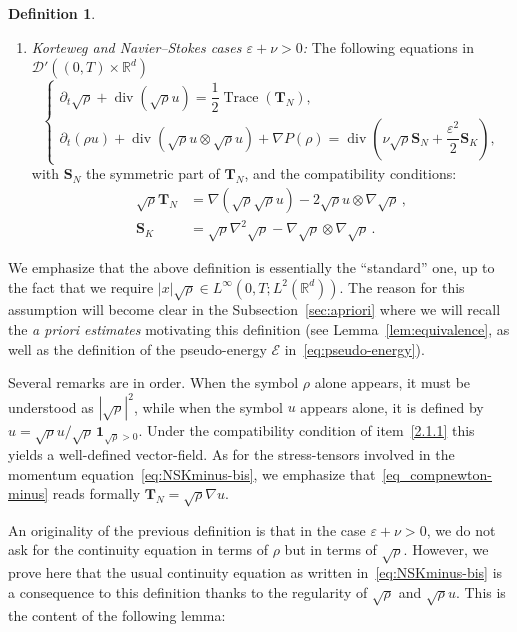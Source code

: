 \documentclass[10pt]{amsart}
\theoremstyle{definition}\newtheorem{defi}[theo]{Definition}\newtheorem{rema}[theo]{Remark}\newtheorem{exam}[theo]{Example}\newtheorem{exem}[theo]{Example}\newtheorem{nota}[theo]{Notation}
\DeclareMathOperator{\DIV}{div}
\DeclareMathOperator{\Trace}{Trace}
\newcommand*\R{\mathbb{R}}
\newcommand*\<{\left\langle}
\renewcommand*\>{\right\rangle}
\newcommand*\eps{\varepsilon}
\begin{document}
\begin{defi}
\begin{enumerate}
\item \label{2.1.3} \emph{Korteweg and Navier--Stokes cases $\eps + \nu > 0$:} The following equations in $\mathcal D'((0,T)\times \mathbb R^d)$
\begin{equation}\label{eq:NSKminus-bis}
\begin{cases}
\partial_t\sqrt{\rho}+\DIV (\sqrt{\rho} u)= \dfrac{1}{2}\Trace(\mathbf T_N),\\
\partial_t ({\rho}u) +\DIV (\sqrt{\rho}u \otimes \sqrt{\rho}u) + \nabla P(\rho) =\DIV \left(\nu\sqrt \rho \mathbf S_N + \dfrac{\varepsilon^2}{2} \mathbf S_K\right)\!,
\end{cases}
\end{equation}
with $\mathbf S_N$ the symmetric part of $\mathbf T_N$, and the compatibility conditions:
\begin{align}\label{eq_compnewton-minus}
\sqrt{\rho}\mathbf T_{N} &= \nabla(\sqrt{\rho} \sqrt{\rho} u) - 2 \sqrt{\rho}u \otimes \nabla \sqrt{\rho}\,, \\
\mathbf S_K &=\sqrt{\rho}\nabla^2 \sqrt{\rho} - \nabla \sqrt{\rho} \otimes \nabla
\sqrt{\rho}\,. \label{eq_compbohm-minus}
\end{align}
\end{enumerate}
\end{defi}

We emphasize that the above definition is essentially the ``standard'' one, up to the fact that we require $|x|\sqrt\rho\in L^\infty(0,T;L^2(\R^d))$. The reason for this assumption will become clear in the Subsection~\ref{sec:apriori} where we will recall the \emph{a priori estimates} motivating this definition (see Lemma~\ref{lem:equivalence}, as well as the definition of the pseudo-energy $\mathcal E$ in~\eqref{eq:pseudo-energy}).

Several remarks are in order. When the symbol $\rho$ alone appears, it must be understood as $|\sqrt{\rho}|^2$, while when the symbol $u$ appears alone, it is defined by $u =
\sqrt{\rho}u/\sqrt{\rho}\,\mathbf 1_{\sqrt{\rho}>0}.$ Under the compatibility condition of item~\eqref{2.1.1} this yields a well-defined vector-field. As for the stress-tensors involved in the momentum equation~\eqref{eq:NSKminus-bis}, we emphasize that~\eqref{eq_compnewton-minus} reads formally $\mathbf T_N = \sqrt{\rho} \nabla u.$

An originality of the previous definition is that in the case $\eps+\nu>0$, we do not ask for the continuity equation in terms of $\rho$ but in terms of $\sqrt{\rho}.$ However, we prove here that the usual continuity equation as written in~\eqref{eq:NSKminus-bis} is a consequence to this definition thanks to the regularity of $\sqrt{\rho}$ and $\sqrt{\rho}u.$ This is the content of the following lemma:
\end{document}
